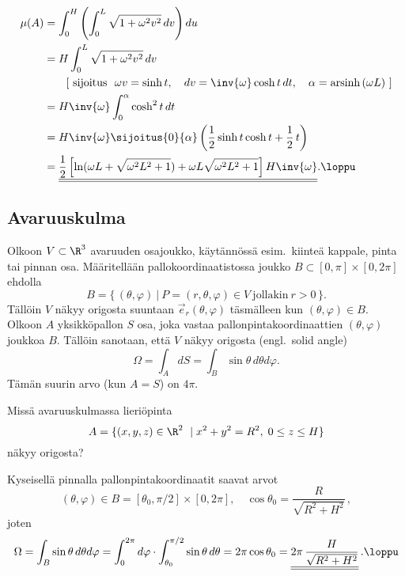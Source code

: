 \begin{align*}
\mu(A) &= \int_0^H\left(\int_0^L \sqrt{1+\omega^2 v^2}\,dv\right)du \\
&= H\int_0^L \sqrt{1+\omega^2 v^2}\,dv \\
&\qquad [\ \text{sijoitus}\ \ \omega v=\sinh t,\quad dv=\inv{\omega}\cosh t\,dt,\quad 
                              \alpha=\text{arsinh}\, (\omega L)\ ] \\
&=H\inv{\omega}\int_0^\alpha \cosh^2 t\,dt \\
&=H\inv{\omega}\sijoitus{0}{\alpha} \left(\frac{1}{2}\sinh t\cosh t+\frac{1}{2}\,t\right) \\
&=\underline{\underline{
    \frac{1}{2}\left[\ln (\omega L +\sqrt{\omega^2 L^2+1})
                                   +\omega L\sqrt{\omega^2 L^2+1}\right]H\inv{\omega}}}. \loppu
\end{align*}

\subsection{Avaruuskulma}

Olkoon $V\subset\R^3$ avaruuden osajoukko, käytännössä esim.\ kiinteä kappale, pinta tai pinnan
osa. Määritellään pallokoordinaatistossa joukko $B\subset[0,\pi]\times[0,2\pi]$ ehdolla
\[
B=\{\,(\theta,\varphi)\ | \ P=(r,\theta,\varphi) \in V\ \text{jollakin}\ r>0\,\}.
\]
Tällöin $V$ näkyy origosta suuntaan $\vec e_r(\theta,\varphi)$ täsmälleen kun
$(\theta,\varphi) \in B$. Olkoon $A$ yksikköpallon $S$ osa, joka vastaa
pallonpintakoordinaattien $(\theta,\varphi)$ joukkoa $B$. Tällöin sanotaan, että $V$ näkyy
origosta  (engl.\ solid angle)
\[
\Omega=\int_A dS=\int_B \sin\theta\,d\theta d\varphi.
\]
Tämän suurin arvo (kun $A=S$) on $4\pi$.
\begin{Exa}
Missä avaruuskulmassa lieriöpinta
\[
A=\{(x,y,z)\in\R^2 \; | \; x^2+y^2=R^2, \; 0\leq z\leq H\}
\]
näkyy origosta?
\end{Exa}
\ratk Kyseisellä pinnalla pallonpintakoordinaatit saavat arvot
\[
(\theta,\varphi) \in B=[\theta_0,\pi/2]\times[0,2\pi],\quad 
                 \cos\theta_0=\frac{R}{\sqrt{R^2+H^2}}\,,
\]
joten
\[
\Omega = \int_B \sin\theta\,d\theta d\varphi
       = \int_0^{2\pi} d\varphi\cdot\int_{\theta_0}^{\pi/2} \sin\theta\,d\theta
       = 2\pi\cos\theta_0
       =\underline{\underline{2\pi\,\frac{H}{\sqrt{R^2+H^2}}}}\,. \loppu
\]

